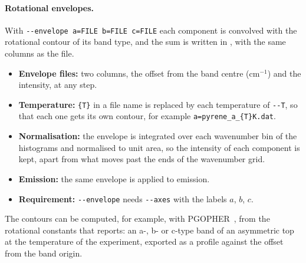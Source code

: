 \paragraph{Rotational envelopes.} With \texttt{-{}-envelope a=FILE b=FILE
c=FILE} each component is convolved with the rotational contour of its band
type, and the sum is written in , with the
same columns as the  file.
\begin{itemize}
\item \textbf{Envelope files:} two columns, the offset from the band
  centre (cm$^{-1}$) and the intensity, at any step.
\item \textbf{Temperature:} \texttt{\{T\}} in a file name is replaced
  by each temperature of \texttt{-{}-T}, so that each one gets its own
  contour, for example \texttt{a=pyrene\_a\_\{T\}K.dat}.
\item \textbf{Normalisation:} the envelope is integrated over each
  wavenumber bin of the histograms and normalised to unit area, so the
  intensity of each component is kept, apart from what moves past the
  ends of the wavenumber grid.
\item \textbf{Emission:} the same envelope is applied to emission.
\item \textbf{Requirement:} \texttt{-{}-envelope} needs \texttt{-{}-axes}
  with the labels $a$, $b$, $c$.
\end{itemize}
The contours can be computed, for example, with PGOPHER~\cite{pgopher},
from the rotational constants that  reports: an a-,
b- or c-type band of an asymmetric top at the temperature of the
experiment, exported as a profile against the offset from the band origin.

